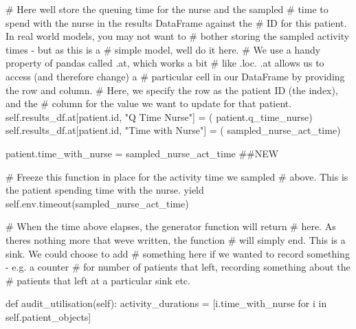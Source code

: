 \documentclass[
  letterpaper,
  DIV=11,
  numbers=noendperiod]{scrreprt}
\newenvironment{Shaded}{\begin{snugshade}}{\end{snugshade}}
\newcommand{\BuiltInTok}[1]{\textcolor[rgb]{0.00,0.23,0.31}{#1}}
\newcommand{\CommentTok}[1]{\textcolor[rgb]{0.37,0.37,0.37}{#1}}
\newcommand{\ControlFlowTok}[1]{\textcolor[rgb]{0.00,0.23,0.31}{#1}}
\newcommand{\KeywordTok}[1]{\textcolor[rgb]{0.00,0.23,0.31}{#1}}
\newcommand{\NormalTok}[1]{\textcolor[rgb]{0.00,0.23,0.31}{#1}}
\newcommand{\OperatorTok}[1]{\textcolor[rgb]{0.37,0.37,0.37}{#1}}
\newcommand{\StringTok}[1]{\textcolor[rgb]{0.13,0.47,0.30}{#1}}
\newcommand{\VariableTok}[1]{\textcolor[rgb]{0.07,0.07,0.07}{#1}}
\begin{document}
\begin{tcolorbox}
\begin{Shaded}
\begin{Highlighting}[]
            \CommentTok{\# Here we\textquotesingle{}ll store the queuing time for the nurse and the sampled}
            \CommentTok{\# time to spend with the nurse in the results DataFrame against the}
            \CommentTok{\# ID for this patient.  In real world models, you may not want to}
            \CommentTok{\# bother storing the sampled activity times {-} but as this is a}
            \CommentTok{\# simple model, we\textquotesingle{}ll do it here.}
            \CommentTok{\# We use a handy property of pandas called .at, which works a bit}
            \CommentTok{\# like .loc.  .at allows us to access (and therefore change) a}
            \CommentTok{\# particular cell in our DataFrame by providing the row and column.}
            \CommentTok{\# Here, we specify the row as the patient ID (the index), and the}
            \CommentTok{\# column for the value we want to update for that patient.}
            \VariableTok{self}\NormalTok{.results\_df.at[patient.}\BuiltInTok{id}\NormalTok{, }\StringTok{"Q Time Nurse"}\NormalTok{] }\OperatorTok{=}\NormalTok{ (}
\NormalTok{                patient.q\_time\_nurse)}
            \VariableTok{self}\NormalTok{.results\_df.at[patient.}\BuiltInTok{id}\NormalTok{, }\StringTok{"Time with Nurse"}\NormalTok{] }\OperatorTok{=}\NormalTok{ (}
\NormalTok{                sampled\_nurse\_act\_time)}

\NormalTok{            patient.time\_with\_nurse }\OperatorTok{=}\NormalTok{ sampled\_nurse\_act\_time }\CommentTok{\#\#NEW}

            \CommentTok{\# Freeze this function in place for the activity time we sampled}
            \CommentTok{\# above.  This is the patient spending time with the nurse.}
            \ControlFlowTok{yield} \VariableTok{self}\NormalTok{.env.timeout(sampled\_nurse\_act\_time)}

            \CommentTok{\# When the time above elapses, the generator function will return}
            \CommentTok{\# here.  As there\textquotesingle{}s nothing more that we\textquotesingle{}ve written, the function}
            \CommentTok{\# will simply end.  This is a sink.  We could choose to add}
            \CommentTok{\# something here if we wanted to record something {-} e.g. a counter}
            \CommentTok{\# for number of patients that left, recording something about the}
            \CommentTok{\# patients that left at a particular sink etc.}

    \KeywordTok{def}\NormalTok{ audit\_utilisation(}\VariableTok{self}\NormalTok{):}
\NormalTok{        activity\_durations }\OperatorTok{=}\NormalTok{ [i.time\_with\_nurse }\ControlFlowTok{for}\NormalTok{ i }\KeywordTok{in} \VariableTok{self}\NormalTok{.patient\_objects]}


\end{Highlighting}
\end{Shaded}
\end{tcolorbox}
\end{document}
